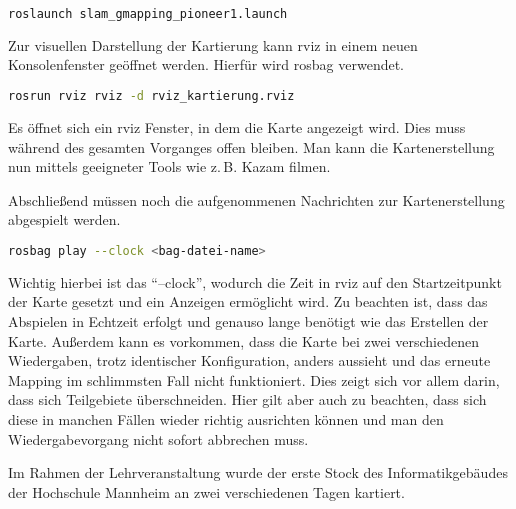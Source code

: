 \begin{lstlisting}[language=sh,caption=Starten der Mapping Nodes]
    roslaunch slam_gmapping_pioneer1.launch
\end{lstlisting}

Zur visuellen Darstellung der Kartierung kann rviz in einem neuen Konsolenfenster geöffnet werden. Hierfür wird rosbag verwendet.

\begin{lstlisting}[language=sh,caption=Öffnen von rviz]
    rosrun rviz rviz -d rviz_kartierung.rviz
\end{lstlisting}

Es öffnet sich ein rviz Fenster, in dem die Karte angezeigt wird. Dies muss während des gesamten Vorganges offen bleiben. Man kann die Kartenerstellung nun mittels geeigneter Tools wie z.\,B. Kazam filmen.

Abschließend müssen noch die aufgenommenen Nachrichten zur Kartenerstellung abgespielt werden.

\begin{lstlisting}[language=sh,caption=Abspielen der aufgenommenen Nachrichten]
    rosbag play --clock <bag-datei-name>
\end{lstlisting}

Wichtig hierbei ist das \enquote{--clock}, wodurch die Zeit in rviz auf den Startzeitpunkt der Karte gesetzt und ein Anzeigen ermöglicht wird. Zu beachten ist, dass das Abspielen in Echtzeit erfolgt und genauso lange benötigt wie das Erstellen der Karte. Außerdem kann es vorkommen, dass die Karte bei zwei verschiedenen Wiedergaben, trotz identischer Konfiguration, anders aussieht und das erneute Mapping im schlimmsten Fall nicht funktioniert. Dies zeigt sich vor allem darin, dass sich Teilgebiete überschneiden. Hier gilt aber auch zu beachten, dass sich diese in manchen Fällen wieder richtig ausrichten können und man den Wiedergabevorgang nicht sofort abbrechen muss.\par
Im Rahmen der Lehrveranstaltung wurde der erste Stock des Informatikgebäudes der Hochschule Mannheim an zwei verschiedenen Tagen kartiert.

